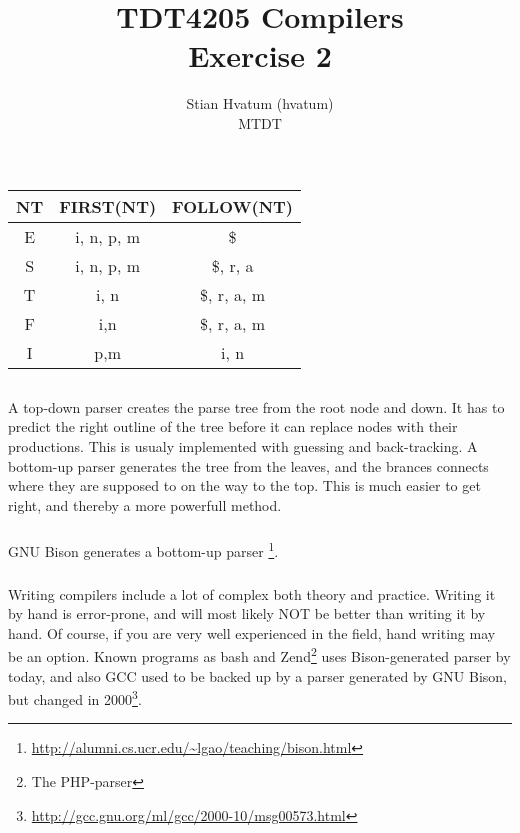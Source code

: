 \documentclass{article}
\title{TDT4205 Compilers\\
\Huge Exercise 2}
\author{Stian Hvatum (hvatum)\\MTDT}
\begin{document}
\maketitle

\section{}
\subsection{}
\begin{tabular}{|c|c|c|}
\hline
NT & FIRST(NT) & FOLLOW(NT) \\
\hline
\hline
E & {i, n, p, m} & {\$} \\
\hline
S & {i, n, p, m} & {\$, r, a}\\
\hline
T & {i, n} & {\$, r, a, m}\\
\hline
F & {i,n} & {\$, r, a, m} \\
\hline
I & {p,m} & {i, n} \\
\hline
\end{tabular}

\subsection{}
\subsubsection{}
A top-down parser creates the parse tree from the root node and down. It has to
predict the right outline of the tree before it can replace nodes with their
productions. This is usualy implemented with guessing and back-tracking. A
bottom-up parser generates the tree from the leaves, and the brances connects where they are supposed to on the way to the top. This is much
easier to get right, and thereby a more powerfull method.

\subsubsection{}
GNU Bison generates a bottom-up parser
\footnote{\url{http://alumni.cs.ucr.edu/~lgao/teaching/bison.html}}.

\subsubsection{}
Writing compilers include a lot of complex both theory and practice. Writing it
by hand is error-prone, and will most likely NOT be better than writing it by
hand. Of course, if you are very well experienced in the field, hand writing may
be an option. Known programs as {\ttfamily bash} and
{\ttfamily Zend\footnote{The PHP-parser}} uses Bison-generated parser by today,
and also GCC used to be backed up by a parser generated by GNU Bison, but
changed in 2000\footnote{\url{http://gcc.gnu.org/ml/gcc/2000-10/msg00573.html}}.
\end{document}
